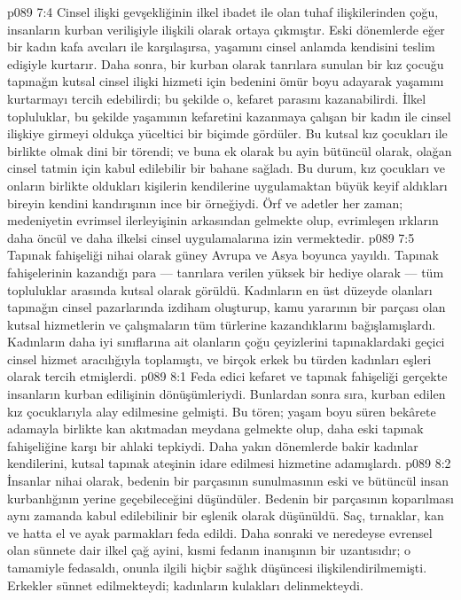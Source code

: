 \vs p089 7:4 Cinsel ilişki gevşekliğinin ilkel ibadet ile olan tuhaf ilişkilerinden çoğu, insanların kurban verilişiyle ilişkili olarak ortaya çıkmıştır. Eski dönemlerde eğer bir kadın kafa avcıları ile karşılaşırsa, yaşamını cinsel anlamda kendisini teslim edişiyle kurtarır. Daha sonra, bir kurban olarak tanrılara sunulan bir kız çocuğu tapınağın kutsal cinsel ilişki hizmeti için bedenini ömür boyu adayarak yaşamını kurtarmayı tercih edebilirdi; bu şekilde o, kefaret parasını kazanabilirdi. İlkel topluluklar, bu şekilde yaşamının kefaretini kazanmaya çalışan bir kadın ile cinsel ilişkiye girmeyi oldukça yüceltici bir biçimde gördüler. Bu kutsal kız çocukları ile birlikte olmak dini bir törendi; ve buna ek olarak bu ayin bütüncül olarak, olağan cinsel tatmin için kabul edilebilir bir bahane sağladı. Bu durum, kız çocukları ve onların birlikte oldukları kişilerin kendilerine uygulamaktan büyük keyif aldıkları bireyin kendini kandırışının ince bir örneğiydi. Örf ve adetler her zaman; medeniyetin evrimsel ilerleyişinin arkasından gelmekte olup, evrimleşen ırkların daha öncül ve daha ilkelsi cinsel uygulamalarına izin vermektedir.
\vs p089 7:5 Tapınak fahişeliği nihai olarak güney Avrupa ve Asya boyunca yayıldı. Tapınak fahişelerinin kazandığı para --- tanrılara verilen yüksek bir hediye olarak --- tüm topluluklar arasında kutsal olarak görüldü. Kadınların en üst düzeyde olanları tapınağın cinsel pazarlarında izdiham oluşturup, kamu yararının bir parçası olan kutsal hizmetlerin ve çalışmaların tüm türlerine kazandıklarını bağışlamışlardı. Kadınların daha iyi sınıflarına ait olanların çoğu çeyizlerini tapınaklardaki geçici cinsel hizmet aracılığıyla toplamıştı, ve birçok erkek bu türden kadınları eşleri olarak tercih etmişlerdi.
\vs p089 8:1 Feda edici kefaret ve tapınak fahişeliği gerçekte insanların kurban edilişinin dönüşümleriydi. Bunlardan sonra sıra, kurban edilen kız çocuklarıyla alay edilmesine gelmişti. Bu tören; yaşam boyu süren bekârete adamayla birlikte kan akıtmadan meydana gelmekte olup, daha eski tapınak fahişeliğine karşı bir ahlaki tepkiydi. Daha yakın dönemlerde bakir kadınlar kendilerini, kutsal tapınak ateşinin idare edilmesi hizmetine adamışlardı.
\vs p089 8:2 İnsanlar nihai olarak, bedenin bir parçasının sunulmasının eski ve bütüncül insan kurbanlığının yerine geçebileceğini düşündüler. Bedenin bir parçasının koparılması aynı zamanda kabul edilebilinir bir eşlenik olarak düşünüldü. Saç, tırnaklar, kan ve hatta el ve ayak parmakları feda edildi. Daha sonraki ve neredeyse evrensel olan sünnete dair ilkel çağ ayini, kısmi fedanın inanışının bir uzantısıdır; o tamamiyle fedasaldı, onunla ilgili hiçbir sağlık düşüncesi ilişkilendirilmemişti. Erkekler sünnet edilmekteydi; kadınların kulakları delinmekteydi.
